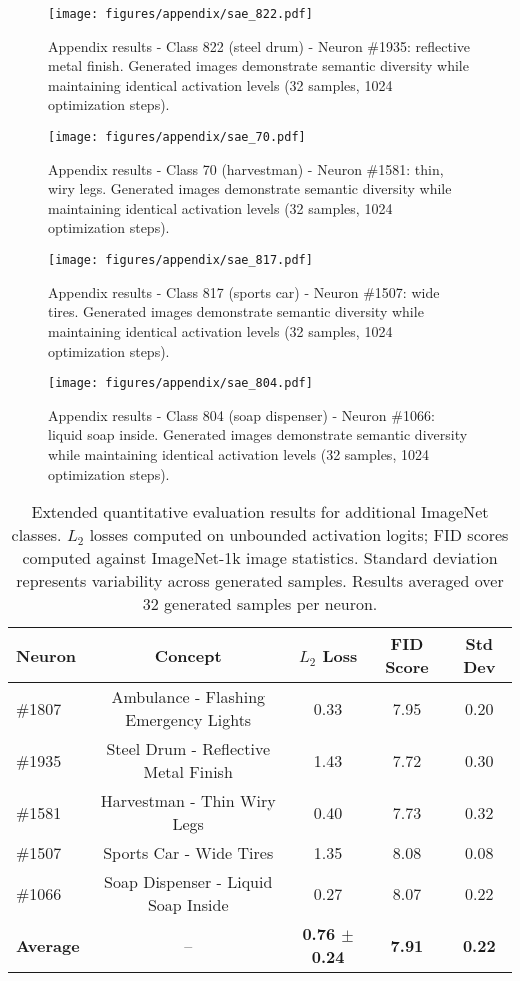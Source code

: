 \begin{figure}[p]
  \centering
  \texttt{[image: figures/appendix/sae\_822.pdf]}
  \caption{Appendix results - Class 822 (steel drum) - Neuron \#1935: reflective metal finish. Generated images demonstrate semantic diversity while maintaining identical activation levels (32 samples, 1024 optimization steps).}
  \label{fig:appendix_822}
\end{figure}

\begin{figure}[p]
  \centering
  \texttt{[image: figures/appendix/sae\_70.pdf]}
  \caption{Appendix results - Class 70 (harvestman) - Neuron \#1581: thin, wiry legs. Generated images demonstrate semantic diversity while maintaining identical activation levels (32 samples, 1024 optimization steps).}
  \label{fig:appendix_70}
\end{figure}

\begin{figure}[p]
  \centering
  \texttt{[image: figures/appendix/sae\_817.pdf]}
  \caption{Appendix results - Class 817 (sports car) - Neuron \#1507: wide tires. Generated images demonstrate semantic diversity while maintaining identical activation levels (32 samples, 1024 optimization steps).}
  \label{fig:appendix_817}
\end{figure}

\begin{figure}[p]
  \centering
  \texttt{[image: figures/appendix/sae\_804.pdf]}
  \caption{Appendix results - Class 804 (soap dispenser) - Neuron \#1066: liquid soap inside. Generated images demonstrate semantic diversity while maintaining identical activation levels (32 samples, 1024 optimization steps).}
  \label{fig:appendix_804}
\end{figure}

\begin{table}[h!]
\centering
\begin{tabular}{lcccc}
\toprule
\textbf{Neuron} & \textbf{Concept} & \textbf{$L_2$ Loss} & \textbf{FID Score} & \textbf{Std Dev} \\
\midrule
\#1807 & Ambulance - Flashing Emergency Lights & 0.33 & 7.95 & 0.20 \\
\#1935 & Steel Drum - Reflective Metal Finish & 1.43 & 7.72 & 0.30 \\
\#1581 & Harvestman - Thin Wiry Legs & 0.40 & 7.73 & 0.32 \\
\#1507 & Sports Car - Wide Tires & 1.35 & 8.08 & 0.08 \\
\#1066 & Soap Dispenser - Liquid Soap Inside & 0.27 & 8.07 & 0.22 \\
\midrule
\textbf{Average} & -- & \textbf{0.76 $\pm$ 0.24} & \textbf{7.91} & \textbf{0.22} \\
\bottomrule
\end{tabular}
\caption{Extended quantitative evaluation results for additional ImageNet classes. $L_2$ losses computed on unbounded activation logits; FID scores computed against ImageNet-1k image statistics. Standard deviation represents variability across generated samples. Results averaged over 32 generated samples per neuron.}
\label{tab:appendix_results}
\end{table}